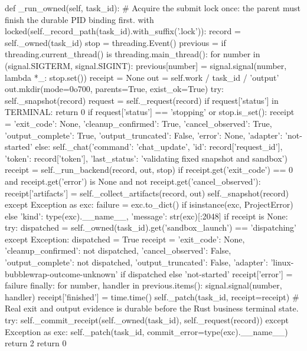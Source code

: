     def _run_owned(self, task_id):
        # Acquire the submit lock once: the parent must finish the durable PID binding first.
        with locked(self._record_path(task_id).with_suffix('.lock')):
            record = self._owned(task_id)
        stop = threading.Event()
        previous = {}
        if threading.current_thread() is threading.main_thread():
            for number in (signal.SIGTERM, signal.SIGINT):
                previous[number] = signal.signal(number, lambda *_: stop.set())
        receipt = None
        out = self.work / task_id / 'output'
        out.mkdir(mode=0o700, parents=True, exist_ok=True)
        try:
            self._snapshot(record)
            request = self._request(record)
            if request['status'] in TERMINAL:
                return 0
            if request['status'] == 'stopping' or stop.is_set():
                receipt = {'exit_code': None, 'cleanup_confirmed': True, 'cancel_observed': True,
                           'output_complete': True, 'output_truncated': False, 'error': None, 'adapter': 'not-started'}
            else:
                self._chat({'command': 'chat_update', 'id': record['request_id'], 'token': record['token'],
                            'last_status': 'validating fixed snapshot and sandbox'})
                receipt = self._run_backend(record, out, stop)
                if receipt.get('exit_code') == 0 and receipt.get('error') is None and not receipt.get('cancel_observed'):
                    receipt['artifacts'] = self._collect_artifacts(record, out)
                self._snapshot(record)
        except Exception as exc:
            failure = exc.to_dict() if isinstance(exc, ProjectError) else {'kind': type(exc).__name__, 'message': str(exc)[:2048]}
            if receipt is None:
                try:
                    dispatched = self._owned(task_id).get('sandbox_launch') == 'dispatching'
                except Exception:
                    dispatched = True
                receipt = {'exit_code': None, 'cleanup_confirmed': not dispatched, 'cancel_observed': False,
                           'output_complete': not dispatched, 'output_truncated': False,
                           'adapter': 'linux-bubblewrap-outcome-unknown' if dispatched else 'not-started'}
            receipt['error'] = failure
        finally:
            for number, handler in previous.items():
                signal.signal(number, handler)
        receipt['finished'] = time.time()
        self._patch(task_id, receipt=receipt)
        # Real exit and output evidence is durable before the Rust business terminal state.
        try:
            self._commit_receipt(self._owned(task_id), self._request(record))
        except Exception as exc:
            self._patch(task_id, commit_error=type(exc).__name__)
            return 2
        return 0



